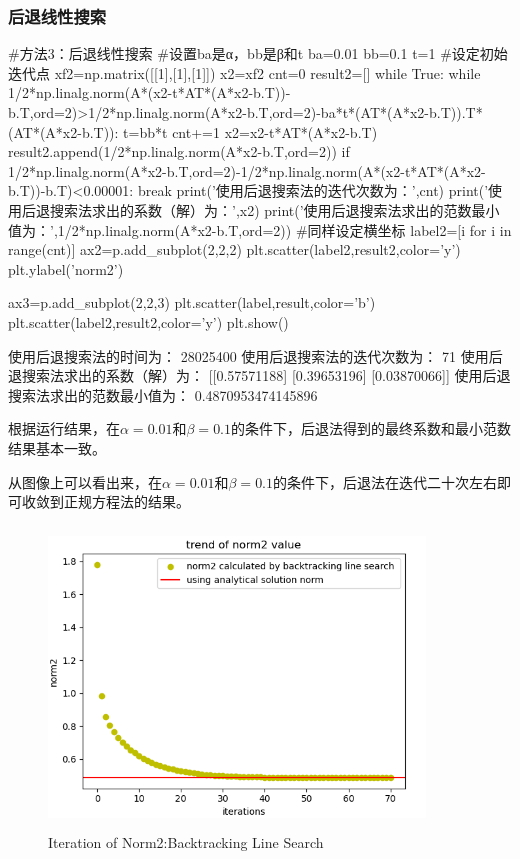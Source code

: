 \documentclass[12pt, a4paper, oneside, fontset=windows]{ctexart}
\begin{document}
\subsubsection{后退线性搜索}
\begin{python}
    #方法3：后退线性搜索
    #设置ba是α，bb是β和t
    ba=0.01
    bb=0.1
    t=1
    #设定初始迭代点
    xf2=np.matrix([[1],[1],[1]])
    x2=xf2
    cnt=0
    result2=[]
    while True:
        while 1/2*np.linalg.norm(A*(x2-t*AT*(A*x2-b.T))-b.T,ord=2)>1/2*np.linalg.norm(A*x2-b.T,ord=2)-ba*t*(AT*(A*x2-b.T)).T*(AT*(A*x2-b.T)):
            t=bb*t
        cnt+=1
        x2=x2-t*AT*(A*x2-b.T)
        result2.append(1/2*np.linalg.norm(A*x2-b.T,ord=2))
        if 1/2*np.linalg.norm(A*x2-b.T,ord=2)-1/2*np.linalg.norm(A*(x2-t*AT*(A*x2-b.T))-b.T)<0.00001:
            break
    print('使用后退搜索法的迭代次数为：\n',cnt)
    print('使用后退搜索法求出的系数（解）为：\n',x2)
    print('使用后退搜索法求出的范数最小值为：\n',1/2*np.linalg.norm(A*x2-b.T,ord=2))
    #同样设定横坐标
    label2=[i for i in range(cnt)]
    ax2=p.add_subplot(2,2,2)
    plt.scatter(label2,result2,color='y')
    plt.ylabel('norm2')
    
    ax3=p.add_subplot(2,2,3)
    plt.scatter(label,result,color='b')
    plt.scatter(label2,result2,color='y')
    plt.show()
\end{python}
\begin{python}
    使用后退搜索法的时间为：
 28025400
使用后退搜索法的迭代次数为：
 71
使用后退搜索法求出的系数（解）为：
 [[0.57571188]
 [0.39653196]
 [0.03870066]]
使用后退搜索法求出的范数最小值为：
 0.4870953474145896
\end{python}

根据运行结果，在$\alpha = 0.01$和$\beta = 0.1$的条件下，后退法得到的最终系数和最小范数结果基本一致。

从图像上可以看出来，在$\alpha = 0.01$和$\beta = 0.1$的条件下，后退法在迭代二十次左右即可收敛到正规方程法的结果。
\begin{figure}[H]
    \centering
    \includegraphics[width=10cm,height=8cm]{Backtracking Line Search.png}
    \caption{Iteration of Norm2:Backtracking Line Search}
\end{figure}
\end{document}

